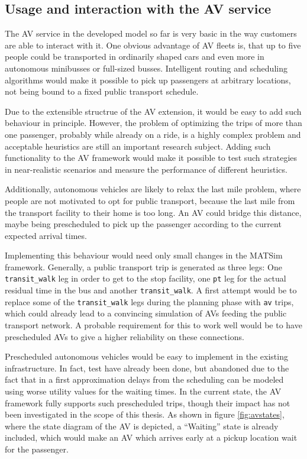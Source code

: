 \subsection{Usage and interaction with the AV service}

The AV service in the developed model so far is very basic in the way customers
are able to interact with it. One obvious advantage of AV fleets is, that up to five people could be transported
in ordinarily shaped cars and even more in autonomous minibusses or full-sized busses.
Intelligent routing and scheduling algorithms would make it possible to pick up passengers
at arbitrary locations, not being bound to a fixed public transport schedule.

Due to the extensible structrue of the AV extension, it would be easy to
add such behaviour in principle. However, the problem of optimizing the trips of
more than one passenger, probably while already on a ride, is a highly complex
problem and acceptable heuristics are still an important research subject.
Adding such functionality to the AV framework would make it possible to test such
strategies in near-realistic scenarios and measure the performance of different
heuristics.

Additionally, autonomous vehicles are likely to relax the last mile problem, where people are not
motivated to opt for public transport, because the last mile from the transport
facility to their home is too long. An AV could bridge this distance, maybe being
prescheduled to pick up the passenger according to the current expected arrival
times.

Implementing this behaviour would need only small changes in the MATSim framework.
Generally, a public transport trip is generated as three legs: One \texttt{transit\_walk}
leg in order to get to the stop facility, one \texttt{pt} leg for the actual residual
time in the bus  and another \texttt{transit\_walk}. A first attempt
would be to replace some of the \texttt{transit\_walk} legs during the planning
phase with \texttt{av} trips, which could already lead to a convincing simulation
of AVs feeding the public transport network.
A probable requirement for this to work well would be to have prescheduled AVs
to give a higher reliability on these connections.

Prescheduled autonomous vehicles would be easy to implement in the existing infrastructure.
In fact, test have already been done, but abandoned due to the fact that in a first
approximation delays from the scheduling can be modeled using worse utility values
for the waiting times.
In the current state, the AV framework fully supports such prescheduled trips, though
their impact has not been investigated in the scope of this thesis. As shown in
figure \cref{fig:avstates}, where the state diagram of the AV is depicted, a ``Waiting''
state is already included, which would make an AV which arrives early at a pickup
location wait for the passenger.

